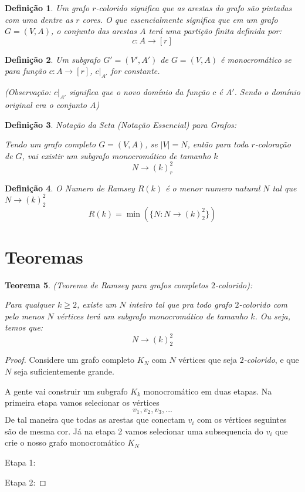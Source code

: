 \documentclass{article}
\newtheorem{teor}{Teorema}[section]
\newtheorem{defi}[teor]{Definição}
\begin{document}
\begin{defi}
    \label{coloring_r}
    Um grafo $r$\emph{-colorido} significa que as arestas do grafo são pintadas com uma dentre as $r$ cores. O que essencialmente significa que em um grafo $G = (V, A)$, o conjunto das arestas $A$ terá uma partição finita definida por:
    \[c:A\rightarrow[r]\]
\end{defi}

\begin{defi}
    \label{monochromatic_k}
    Um subgrafo $G' = (V', A')$ de $G = (V, A)$ é \emph{monocromático} se para função $c:A\rightarrow[r]$, $c|_{A'}$ for constante.

    (Observação: $c|_{A'}$ significa que o novo domínio da função $c$ é $A'$. Sendo o domínio original era o conjunto $A$)
\end{defi}

\begin{defi}
    \label{essential_notation_graph}
    \emph{Notação da Seta (Notação Essencial) para Grafos}:

    Tendo um grafo completo $G = (V, A)$, se $|V| = N$, então para toda $r$\emph{-coloração} de $G$, vai existir um subgrafo monocromático de tamanho $k$
    \[N\longrightarrow(k)_r^2\]
\end{defi}

\begin{defi}
    \label{ramsey_number}
    O \emph{Numero de Ramsey} $R(k)$ é o menor numero natural $N$ tal que $N\longrightarrow(k)_2^2$
    \[R(k) = \min(\{N: N\longrightarrow(k)_2^2\})\]
\end{defi}


\section{Teoremas}


\begin{teor}
    (Teorema de Ramsey para grafos completos $2$\emph{-colorido}):

    Para qualquer $k \ge 2$, existe um $N$ inteiro tal que pra todo grafo $2$\emph{-colorido} com pelo menos $N$ vértices terá um subgrafo monocromático de tamanho $k$. Ou seja, temos que:
    \[N\longrightarrow(k)_2^2\]
\end{teor}

\begin{proof}
    Considere um grafo completo $K_N$ com $N$ vértices que seja $2$\emph{-colorido}, e que $N$ seja suficientemente grande.

    A gente vai construir um subgrafo $K_k$ monocromático em duas etapas. Na primeira etapa vamos selecionar os vértices
    \[v_1, v_2, v_3, ...\]
    De tal maneira que todas as arestas que conectam $v_i$ com os vértices seguintes são de mesma cor. Já na etapa 2 vamos selecionar uma subsequencia do $v_i$ que crie o nosso grafo monocromático $K_N$

    Etapa 1:

    Etapa 2:
\end{proof}
\end{document}
